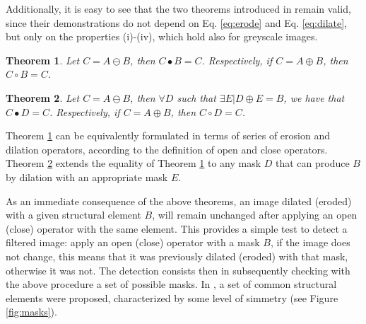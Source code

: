\documentclass[review]{elsarticle}
\newtheorem{theorem}{Theorem}
\begin{document}
Additionally, it is easy to see that the two theorems introduced in \cite{de2017detecting} remain valid, since their demonstrations do not depend on Eq. \ref{eq:erode} and Eq. \ref{eq:dilate}, but only on the properties (i)-(iv), which hold also for greyscale images.

\begin{theorem}
	\label{theorem_1}
	Let $C = A\ominus B$, then $C\bullet B = C$. Respectively, if $C = A \oplus B$, then $C\circ B = C$.
\end{theorem}

\begin{theorem}
	\label{theorem_2}
	Let $C = A\ominus B$, then $\forall D$ such that $\exists E | D\oplus E = B$, we have that $C\bullet D = C$. Respectively, if $C = A \oplus B$, then $C \circ D = C$.
\end{theorem}

Theorem \ref{theorem_1} can be equivalently formulated in terms of series of erosion and dilation operators, according to the definition of open and close operators. Theorem \ref{theorem_2} extends the equality of Theorem \ref{theorem_1} to any mask $D$ that can produce $B$ by dilation with an appropriate mask $E$.

As an immediate consequence of the above theorems, an image dilated (eroded) with a given structural element $B$, will remain unchanged after applying an open (close) operator with the same element. This provides a simple test to detect a filtered image: apply an open (close) operator with a mask $B$, if the image does not change, this means that it was previously dilated (eroded) with that mask, otherwise it was not. The detection consists then in subsequently checking with the above procedure a set of possible masks. In \cite{de2017detecting}, a set of common structural elements were proposed, characterized by some level of simmetry (see Figure \ref{fig:masks}).
\end{document}
